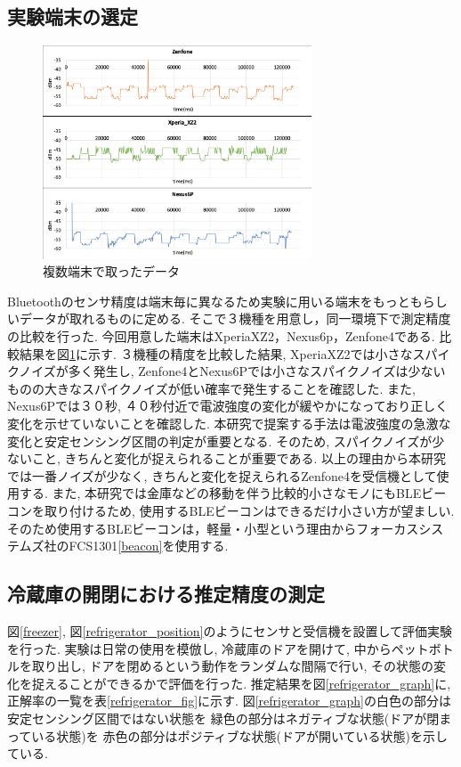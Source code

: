 \documentclass[Japanese]{dicomopapers}
\begin{document}
\subsection{実験端末の選定}

\begin{figure}[ht]
    \centering
    \includegraphics[width=8cm]{mix.png}
    \caption{複数端末で取ったデータ}
    \label{multi-data}
\end{figure}

Bluetoothのセンサ精度は端末毎に異なるため実験に用いる端末をもっともらしいデータが取れるものに定める.
そこで３機種を用意し，同一環境下で測定精度の比較を行った.
今回用意した端末はXperiaXZ2，Nexus6p，Zenfone4である.
比較結果を図\ref{multi-data}に示す.
３機種の精度を比較した結果, XperiaXZ2では小さなスパイクノイズが多く発生し, Zenfone4とNexus6Pでは小さなスパイクノイズは少ないものの大きなスパイクノイズが低い確率で発生することを確認した.
また, Nexus6Pでは３０秒, ４０秒付近で電波強度の変化が緩やかになっており正しく変化を示せていないことを確認した.
本研究で提案する手法は電波強度の急激な変化と安定センシング区間の判定が重要となる.
そのため, スパイクノイズが少ないこと, きちんと変化が捉えられることが重要である.
以上の理由から本研究では一番ノイズが少なく, きちんと変化を捉えられるZenfone4を受信機として使用する.
また, 本研究では金庫などの移動を伴う比較的小さなモノにもBLEビーコンを取り付けるため, 使用するBLEビーコンはできるだけ小さい方が望ましい.
そのため使用するBLEビーコンは，軽量・小型という理由からフォーカスシステムズ社のFCS1301\ref{beacon}を使用する.


\subsection{冷蔵庫の開閉における推定精度の測定}
図\ref{freezer}, 図\ref{refrigerator_position}のようにセンサと受信機を設置して評価実験を行った.
実験は日常の使用を模倣し, 冷蔵庫のドアを開けて, 中からペットボトルを取り出し, ドアを閉めるという動作をランダムな間隔で行い, その状態の変化を捉えることができるかで評価を行った.
推定結果を図\ref{refrigerator_graph}に, 正解率の一覧を表\ref{refrigerator_fig}に示す.
図\ref{refrigerator_graph}の白色の部分は安定センシング区間ではない状態を 緑色の部分はネガティブな状態(ドアが閉まっている状態)を 赤色の部分はポジティブな状態(ドアが開いている状態)を示している.
\end{document}
